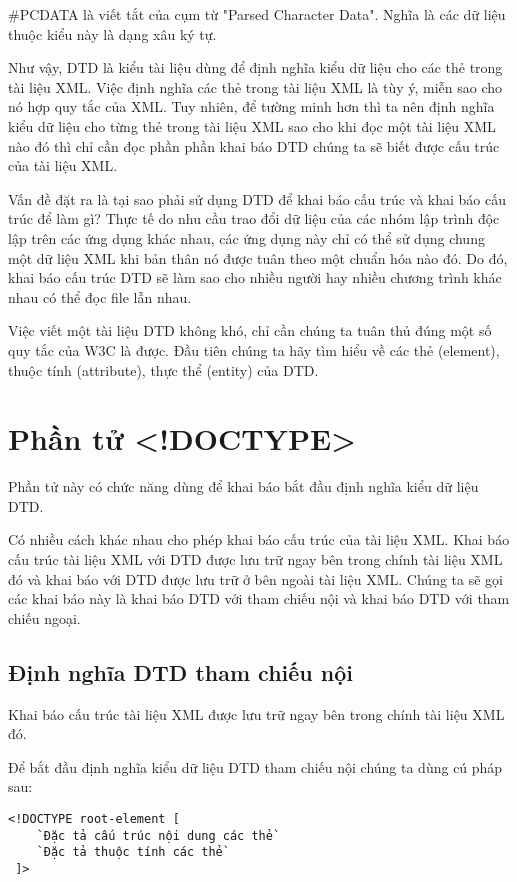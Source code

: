 {\ttfamily  \#PCDATA} là viết tắt của cụm từ "Parsed Character Data". Nghĩa là các dữ liệu thuộc kiểu này là dạng xâu ký tự.

Như vậy, DTD là kiểu tài liệu dùng để định nghĩa kiểu dữ liệu cho các thẻ trong tài liệu XML. Việc định nghĩa các thẻ trong tài liệu XML là tùy ý, miễn sao cho nó hợp quy tắc của XML. Tuy nhiên, để tường minh hơn thì ta nên định nghĩa kiểu dữ liệu cho từng thẻ trong tài liệu XML sao cho khi đọc một tài liệu XML nào đó thì chỉ cần đọc phần phần khai báo DTD chúng ta sẽ biết được cấu trúc của tài liệu XML.

Vấn đề đặt ra là tại sao phải sử dụng DTD để khai báo cấu trúc và khai báo cấu trúc để làm gì? Thực tế do nhu cầu trao đổi dữ liệu của các nhóm lập trình độc lập trên các ứng dụng khác nhau, các ứng dụng này chỉ  có thể sử dụng chung một dữ liệu XML khi bản thân nó được tuân theo một chuẩn hóa nào đó. Do đó, khai báo cấu trúc DTD sẽ làm sao cho nhiều người hay nhiều chương trình khác nhau có thể đọc file lẫn nhau.

Việc viết một tài liệu DTD không khó, chỉ cần chúng ta tuân thủ đúng một số quy tắc của W3C là được. Đầu tiên chúng ta hãy tìm hiểu về các thẻ (element), thuộc tính (attribute), thực thể (entity) của DTD.
\section{ Phần tử <!DOCTYPE>}
\label{muc2.2 }
Phần tử này có chức năng dùng để khai báo bắt đầu định nghĩa kiểu dữ liệu DTD.

Có nhiều cách khác nhau cho phép khai báo cấu trúc của tài liệu XML. Khai báo cấu trúc tài liệu XML với DTD được lưu trữ ngay bên trong chính tài liệu XML đó và khai báo với DTD được lưu trữ ở bên ngoài tài liệu XML. Chúng ta sẽ gọi các khai báo này là khai báo DTD với tham chiếu nội và khai báo DTD với tham chiếu ngoại. 
\subsection{ Định nghĩa DTD tham chiếu nội}

Khai báo cấu trúc tài liệu XML được lưu trữ ngay bên trong chính tài liệu XML đó.

 Để bắt đầu định nghĩa kiểu dữ liệu DTD tham chiếu nội chúng ta dùng cú pháp sau:
\begin{lstlisting}[escapechar=`]
 <!DOCTYPE root-element [
	`Đặc tả cấu trúc nội dung các thẻ`
	`Đặc tả thuộc tính các thẻ`
 ]> 
\end{lstlisting}
 
